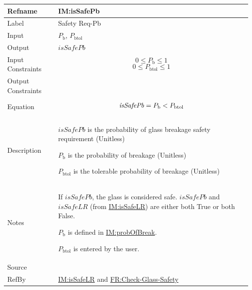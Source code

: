 \documentclass[12pt]{article}
\newcommand{\lt}{\ensuremath <}
\begin{document}
\medskip
\noindent
\begin{minipage}{\textwidth}
\begin{tabular}{>{\raggedright}p{}>{\raggedright\arraybackslash}p{}}
\toprule \textbf{Refname} & \textbf{IM:isSafePb}
\label{IM:isSafePb}
\\ \midrule
Label & Safety Req-Pb
        
\\ \midrule
Input & ${P_{\text{b}}}$, ${P_{\text{b}\text{tol}}}$
        
\\ \midrule
Output & $\mathit{isSafePb}$
         
\\ \midrule
Input Constraints & \begin{displaymath}
                    0\leq{}{P_{\text{b}}}\leq{}1
                    \end{displaymath}
                    \begin{displaymath}
                    0\leq{}{P_{\text{b}\text{tol}}}\leq{}1
                    \end{displaymath}
\\ \midrule
Output Constraints & 
\\ \midrule
Equation & \begin{displaymath}
           \mathit{isSafePb}={P_{\text{b}}}\lt{}{P_{\text{b}\text{tol}}}
           \end{displaymath}
\\ \midrule
Description & \begin{symbDescription}
              \item{$\mathit{isSafePb}$ is the probability of glass breakage safety requirement (Unitless)}
              \item{${P_{\text{b}}}$ is the probability of breakage (Unitless)}
              \item{${P_{\text{b}\text{tol}}}$ is the tolerable probability of breakage (Unitless)}
              \end{symbDescription}
\\ \midrule
Notes & If $\mathit{isSafePb}$, the glass is considered safe. $\mathit{isSafePb}$ and $\mathit{isSafeLR}$ (from \hyperref[IM:isSafeLR]{IM:isSafeLR}) are either both True or both False.
        
        ${P_{\text{b}}}$ is defined in \hyperref[IM:probOfBreak]{IM:probOfBreak}.
        
        ${P_{\text{b}\text{tol}}}$ is entered by the user.
        
\\ \midrule
Source & \cite{astm2009}
         
\\ \midrule
RefBy & \hyperref[IM:isSafeLR]{IM:isSafeLR} and \hyperref[checkGlassSafety]{FR:Check-Glass-Safety}
        
\\ \bottomrule
\end{tabular}
\end{minipage}
\end{document}

